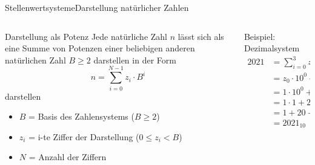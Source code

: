 \documentclass[xelatex,aspectratio=169]{beamer}
\begin{document}
\begin{frame}{Stellenwertsysteme}{Darstellung natürlicher Zahlen}
  \begin{columns}
    \begin{column}{0.5\textwidth}
      \begin{block}{Darstellung als Potenz}
        Jede natürliche Zahl \(n\) lässt sich als eine Summe von Potenzen einer beliebigen anderen natürlichen Zahl \(B \geq 2 \) darstellen in der Form
        \[
          n = \sum_{i=0}^{N-1} z_i \cdot B^i
        \]
        darstellen
        \begin{itemize}
          \item \(B\) = Basis des Zahlensystems (\(B \geq 2\))
          \item \(z_i\) = i-te Ziffer der Darstellung (\(0 \leq z_i < B\))
          \item \(N\) = Anzahl der Ziffern
        \end{itemize}
      \end{block}
    \end{column}
    \begin{column}{0.5\textwidth}
      \begin{exampleblock}{Beispiel: Dezimalsystem}
        \smaller
        \begin{align*}
          2021 & = \sum_{i=0}^{3} z_i \cdot 10^i                                     \\
               & = z_0 \cdot 10^0 + z_1 \cdot 10^1 + z_2 \cdot 10^2 + z_3 \cdot 10^3 \\
               & = 1 \cdot 10^0 + 2 \cdot 10^1 + 0 \cdot 10^2 + 2 \cdot 10^3         \\
               & = 1 \cdot 1 + 2 \cdot 10 + 0 \cdot 100 + 2 \cdot 1000               \\
               & = 1 + 20 + 0 + 2000                                                 \\
               & = 2021_{10}
        \end{align*}
      \end{exampleblock}
    \end{column}
  \end{columns}
\end{frame}
\end{document}
